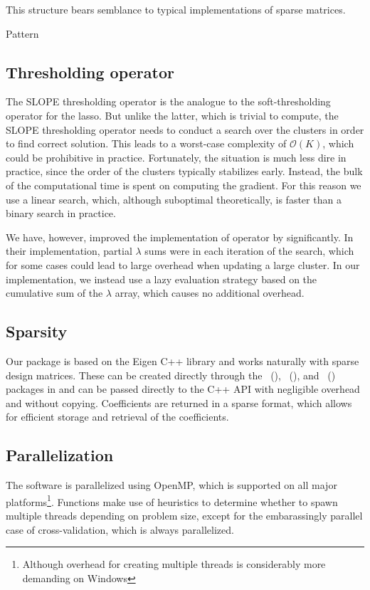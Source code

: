 \documentclass[article]{jss}
\begin{document}
This structure bears semblance to typical implementations of
sparse matrices.

Pattern~\citep{schneider2022}

\subsection{Thresholding operator}

The SLOPE thresholding operator is the analogue to the
soft-thresholding operator for the lasso. But unlike the
latter, which is trivial to compute, the SLOPE thresholding operator
needs to conduct a search over the clusters in order to find correct
solution. This leads to a worst-case complexity of
\(\mathcal{O}(K)\), which could be prohibitive in practice.
Fortunately, the situation is much less dire in practice, since
the order of the clusters typically stabilizes early. Instead, the
bulk of the computational time is spent on computing the gradient.
For this reason we use a linear search, which, although suboptimal
theoretically, is faster than a binary search in practice.

We have, however, improved the implementation of
operator by \citet{larsson2023} significantly. In their implementation,
partial \(\lambda\) sums were in each iteration of the search, which
for some cases could lead to large overhead when updating
a large cluster. In our implementation, we instead use a lazy
evaluation strategy based on the cumulative sum of the \(\lambda\) array,
which causes no additional overhead.

\subsection{Sparsity}

Our package is based on the Eigen C++ library and works naturally with sparse
design matrices. These can be created directly through the
~(), ~(), and ~() packages in
and can be passed directly to the C++ API with negligible overhead
and without copying. Coefficients are returned in a sparse format, which
allows for efficient storage and retrieval of the coefficients.

\subsection{Parallelization}

The software is parallelized using OpenMP, which is supported
on all major platforms\footnote{Although overhead for creating
  multiple threads is considerably more demanding on Windows}.
Functions make use of heuristics to determine whether to
spawn multiple threads depending on problem size, except for
the embarassingly parallel case of cross-validation, which is always
parallelized.
\end{document}
